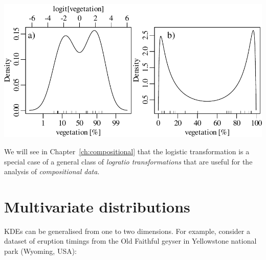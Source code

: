 \noindent\begin{minipage}[t][][b]{.6\textwidth}
  \includegraphics[width=\textwidth]{../figures/logitKDE.pdf}\medskip
\end{minipage}
\begin{minipage}[t][][t]{.4\textwidth}
  \label{fig:logitKDE}
\end{minipage}

We will see in Chapter~\ref{ch:compositional} that the logistic
transformation is a special case of a general class of \emph{logratio
  transformations} that are useful for the analysis of
\emph{compositional data}.

\section{Multivariate distributions}
\label{sec:multivariate}

KDEs can be generalised from one to two dimensions.  For example,
consider a dataset of eruption timings from the Old Faithful geyser in
Yellowstone national park (Wyoming, USA): \medskip

